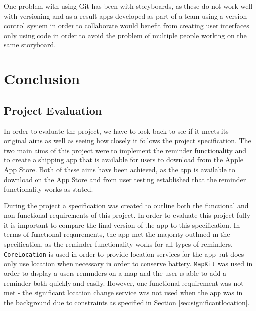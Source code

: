 \documentclass[12pt]{report}
\begin{document}
One problem with using Git has been with storyboards, as these do not work well with versioning and as a result apps developed as part of a team using a version control system in order to collaborate would benefit from creating user interfaces only using code in order to avoid the problem of multiple people working on the same storyboard.

\chapter{Conclusion}

\section{Project Evaluation}

In order to evaluate the project, we have to look back to see if it meets its original aims as well as seeing how closely it follows the project specification. The two main aims of this project were to implement the reminder functionality and to create a shipping app that is available for users to download from the Apple App Store. Both of these aims have been achieved, as the app is available to download on the App Store \cite{classmate} and from user testing established that the reminder functionality works as stated.

During the project a specification was created to outline both the functional and non functional requirements of this project. In order to evaluate this project fully it is important to compare the final version of the app to this specification. In terms of functional requirements, the app met the majority outlined in the specification, as the reminder functionality works for all types of reminders. \texttt{CoreLocation} is used in order to provide location services for the app but does only use location when necessary in order to conserve battery. \texttt{MapKit} was used in order to display a users reminders on a map and the user is able to add a reminder both quickly and easily. However, one functional requirement was not met - the  significant location change service was not used when the app was in the background due to constraints as specified in Section \ref{sec:significantlocation}.\\
\end{document}
